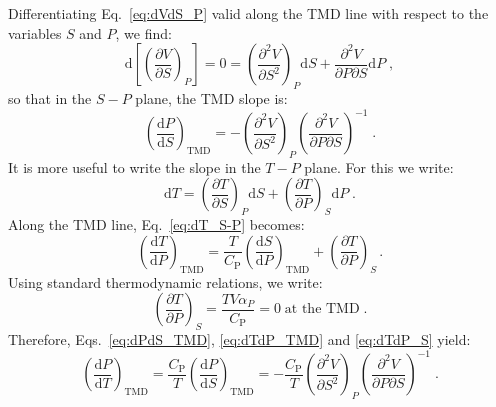 \documentclass[12pt]{article}
\newcommand{\mrm}{\mathrm}
\newcommand{\CP}{C_\mrm{P}}
\begin{document}
Differentiating Eq.~\ref{eq:dVdS_P} valid along the TMD line with respect to the variables $S$ and $P$, we find:
\begin{equation}
\mrm{d} \left[ \left(\frac{\partial V}{\partial S} \right)_P \right] = 0 = \left(\frac{\partial^2 V}{\partial S^2} \right)_P \mrm{d}S + \frac{\partial^2 V}{\partial P \partial S} \mrm{d}P \; ,
\label{eq:dVdS_P2}
\end{equation}
so that in the $S-P$ plane, the TMD slope is:
\begin{equation}
\left( \frac{\mrm{d}P}{\mrm{d}S} \right)_\mrm{TMD} = -
\left(\frac{\partial^2 V}{\partial S^2}\right)_P
\left(\frac{\partial^2 V}{\partial P \partial S} \right)^{-1} \; .
\label{eq:dPdS_TMD}
\end{equation}
It is more useful to write the slope in the $T-P$ plane. For this we write:
\begin{equation}
\mrm{d}T = \left( \frac{\partial T}{\partial S} \right)_P \mrm{d}S + \left( \frac{\partial T}{\partial P} \right)_S \mrm{d}P \; .
\label{eq:dT_S-P}
\end{equation}
Along the TMD line, Eq.~\ref{eq:dT_S-P} becomes:
\begin{equation}
\left( \frac{\mrm{d} T}{\mrm{d} P} \right)_\mrm{TMD} =
\frac{T}{\CP} \left( \frac{\mrm{d} S}{\mrm{d} P} \right)_\mrm{TMD} + \left( \frac{\partial T}{\partial P} \right)_S \, .
\label{eq:dTdP_TMD}
\end{equation}
Using standard thermodynamic relations, we write:
\begin{equation}
\left( \frac{\partial T}{\partial P} \right)_S = \frac{T V \alpha_P}{\CP} = 0 \;\textrm{at the TMD} \; .
\label{eq:dTdP_S}
\end{equation}
Therefore, Eqs.~\ref{eq:dPdS_TMD}, \ref{eq:dTdP_TMD} and \ref{eq:dTdP_S} yield:
\begin{equation}
\left( \frac{\mrm{d} P}{\mrm{d} T} \right)_\mrm{TMD} = \frac{\CP}{T} \left( \frac{\mrm{d} P}{\mrm{d} S} \right)_\mrm{TMD} = - \frac{\CP}{T} \left(\frac{\partial^2 V}{\partial S^2}\right)_P
\left(\frac{\partial^2 V}{\partial P \partial S} \right)^{-1} \; .
\label{eq:dPdT_TMD}
\end{equation}
\end{document}
